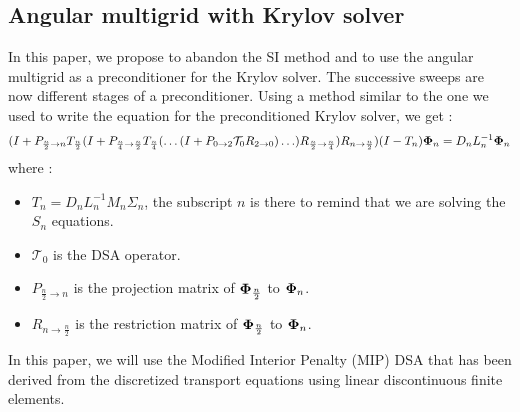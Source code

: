 \subsection{Angular multigrid with Krylov solver}
In this paper, we propose to abandon the SI method and to use the angular
multigrid as a preconditioner for the Krylov solver. The successive sweeps are
now different stages of a preconditioner. Using a method similar to the one
we used to write the equation for the preconditioned Krylov solver, we get :
\begin{equation}
(I+P_{\frac{n}{2}\rightarrow n }
T_{\frac{n}{2}} (I+P_{\frac{n}{4}\rightarrow\frac{n}{2}}T_{\frac{n}{4}} (\hdots
(I+P_{0\rightarrow 2} \mathcal{T}_0 R_{2\rightarrow 0})\hdots)
R_{\frac{n}{2}\rightarrow \frac{n}{4}})R_{n\rightarrow\frac{n}{2}})(I-T_n)
\boldsymbol{\Phi}_n = D_n L_n^{-1} \boldsymbol{\Phi}_n
\end{equation}  
where :
\begin{itemize}
\item $T_n = D_n L_n^{-1}M_n \Sigma_n$, the subscript $n$ is there to remind
that we are solving the $S_n$ equations.
\item $\mathcal{T}_0$ is the DSA operator.
\item $P_{\frac{n}{2}\rightarrow n}$ is the projection matrix of
$\boldsymbol{\Phi}_{\frac{n}{2}}$ to $\boldsymbol{\Phi}_n$.
\item $R_{n\rightarrow \frac{n}{2}}$ is the restriction matrix of
$\boldsymbol{\Phi}_{\frac{n}{2}}$ to $\boldsymbol{\Phi}_n$.
\end{itemize}
In this paper, we will use the Modified Interior Penalty (MIP) DSA \cite{mip}
that has been derived from the discretized transport equations using linear
discontinuous finite elements.
